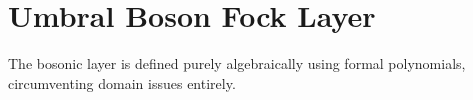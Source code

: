 \chapter{Umbral Boson Fock Layer}
The bosonic layer is defined purely algebraically using formal polynomials, circumventing domain issues entirely.
